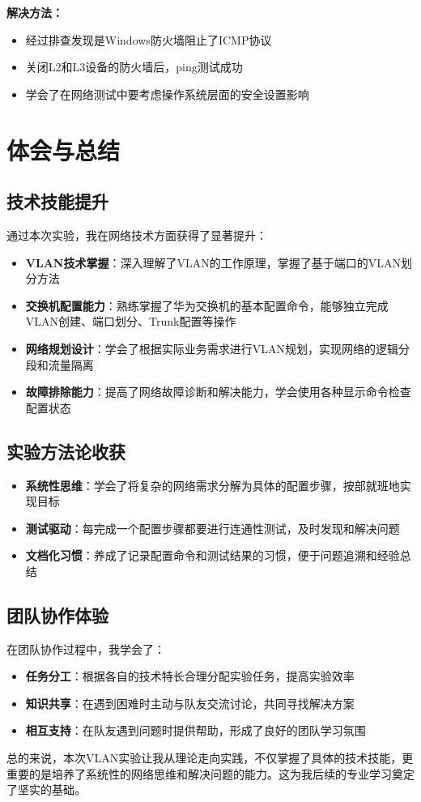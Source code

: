 \documentclass[a4paper]{article}
\begin{document}
\textbf{解决方法：}
\begin{itemize}
    \item 经过排查发现是Windows防火墙阻止了ICMP协议
    \item 关闭L2和L3设备的防火墙后，ping测试成功
    \item 学会了在网络测试中要考虑操作系统层面的安全设置影响
\end{itemize}

\section{体会与总结}

\subsection{技术技能提升}
通过本次实验，我在网络技术方面获得了显著提升：
\begin{itemize}
    \item \textbf{VLAN技术掌握}：深入理解了VLAN的工作原理，掌握了基于端口的VLAN划分方法
    \item \textbf{交换机配置能力}：熟练掌握了华为交换机的基本配置命令，能够独立完成VLAN创建、端口划分、Trunk配置等操作
    \item \textbf{网络规划设计}：学会了根据实际业务需求进行VLAN规划，实现网络的逻辑分段和流量隔离
    \item \textbf{故障排除能力}：提高了网络故障诊断和解决能力，学会使用各种显示命令检查配置状态
\end{itemize}

\subsection{实验方法论收获}
\begin{itemize}
    \item \textbf{系统性思维}：学会了将复杂的网络需求分解为具体的配置步骤，按部就班地实现目标
    \item \textbf{测试驱动}：每完成一个配置步骤都要进行连通性测试，及时发现和解决问题
    \item \textbf{文档化习惯}：养成了记录配置命令和测试结果的习惯，便于问题追溯和经验总结
\end{itemize}

\subsection{团队协作体验}
在团队协作过程中，我学会了：
\begin{itemize}
    \item \textbf{任务分工}：根据各自的技术特长合理分配实验任务，提高实验效率
    \item \textbf{知识共享}：在遇到困难时主动与队友交流讨论，共同寻找解决方案
    \item \textbf{相互支持}：在队友遇到问题时提供帮助，形成了良好的团队学习氛围
\end{itemize}

总的来说，本次VLAN实验让我从理论走向实践，不仅掌握了具体的技术技能，更重要的是培养了系统性的网络思维和解决问题的能力。这为我后续的专业学习奠定了坚实的基础。
\end{document}
